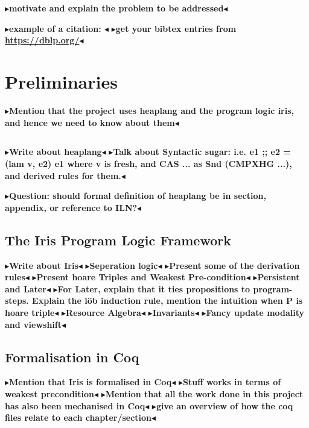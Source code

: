 \documentclass[a4paper, 11pt]{report}
\newcommand{\todo}[1]{{\color[rgb]{.5,0,0}\textbf{$\blacktriangleright$#1$\blacktriangleleft$}}}
\begin{document}
\todo{motivate and explain the problem to be addressed}

\todo{example of a citation: \cite{DBLP:conf/podc/MichaelS96}}
\todo{get your bibtex entries from \url{https://dblp.org/}}


\chapter{Preliminaries}
\label{ch:preliminaries}

\todo{Mention that the project uses heaplang and the program logic iris, and hence we need to know about them}


\section{\heaplang}
\label{Pre:section:heaplang}

\todo{Write about heaplang}
\todo{Talk about Syntactic sugar: i.e. e1 ;; e2 = (lam v, e2) e1 where v is fresh, and CAS ... as Snd (CMPXHG ...), and derived rules for them.}

\todo{Question: should formal definition of heaplang be in section, appendix, or reference to ILN?}

\section{The Iris Program Logic Framework}
\label{Pre:section:iris}

\todo{Write about Iris}
\todo{Seperation logic}
\todo{Present some of the derivation rules}
\todo{Present hoare Triples and Weakest Pre-condition}
\todo{Persistent and Later}
  \todo{For Later, explain that it ties propositions to program-steps. Explain the löb induction rule, mention the intuition when P is hoare triple}
\todo{Resource Algebra}
\todo{Invariants}
\todo{Fancy update modality and viewshift}


\section{Formalisation in Coq}
\label{Pre:section:coq}

\todo{Mention that Iris is formalised in Coq}
\todo{Stuff works in terms of weakest precondition}
\todo{Mention that all the work done in this project has also been mechanised in Coq}
\todo{give an overview of how the coq files relate to each chapter/section}
\end{document}
